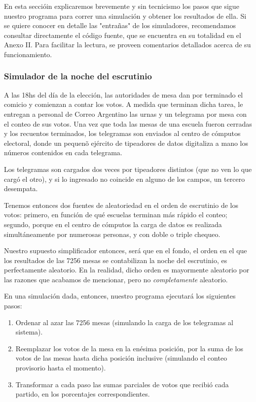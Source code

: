 \documentclass[12pt, a4paper]{article}
\begin{document}
En esta secci\'oin explicaremos brevemente y sin tecnicismo los pasos que sigue nuestro programa para correr una simulaci\'on y obtener los resultados de ella. 
Si se quiere conocer en detalle las "entra\~nas" de los simuladores, recomendamos consultar directamente el c\'odigo fuente, que se encuentra en su totalidad en el Anexo II. Para facilitar la lectura, se proveen comentarios detallados acerca de su funcionamiento.

\subsubsection{Simulador de la noche del escrutinio}

A las 18hs del d\'ia de la elecci\'on, las autoridades de mesa dan por terminado el comicio y comienzan a contar los votos. A medida que terminan dicha tarea, le entregan a personal de Correo Argentino las urnas y un telegrama por mesa con el conteo de sus votos. Una vez que toda las mesas de una escuela fueron cerradas y los recuentos terminados, los telegramas son enviados al centro de c\'omputos electoral, donde un pequen\~o ej\'ercito de tipeadores de datos digitaliza a mano los n\'umeros contenidos en cada telegrama.

Los telegramas son cargados dos veces por tipeadores distintos (que no ven lo que carg\'o el otro), y si lo ingresado no coincide en alguno de los campos, un tercero desempata.

Tenemos entonces dos fuentes de aleatoriedad en el orden de escrutinio de los votos: primero, en funci\'on de qu\'e escuelas terminan m\'as r\'apido el conteo; segundo, porque en el centro de c\'omputos la carga de datos es realizada simult\'aneamente por numerosas personas, y con doble o triple chequeo.

Nuestro supuesto simplificador entonces, ser\'a que en el fondo, el orden en el que los resultados de las 7256 mesas se contabilizan la noche del escrutinio, es perfectamente aleatorio. En la realidad, dicho orden es mayormente aleatorio por las razones que acabamos de mencionar, pero no \emph{completamente} aleatorio.

En una simulaci\'on dada, entonces, nuestro programa ejecutar\'a los siguientes pasos:

\begin{enumerate}
	\item Ordenar al azar las 7256 mesas (simulando la carga de los telegramas al sistema).
	\item Reemplazar los votos de la mesa en la en\'esima posici\'on, por la suma de los votos de las mesas hasta dicha posici\'on inclusive (simulando el conteo provisorio hasta el momento).
	\item Transformar a cada paso las sumas parciales de votos que recibi\'o cada partido, en los porcentajes correspondientes.
\end{enumerate}
\end{document}
